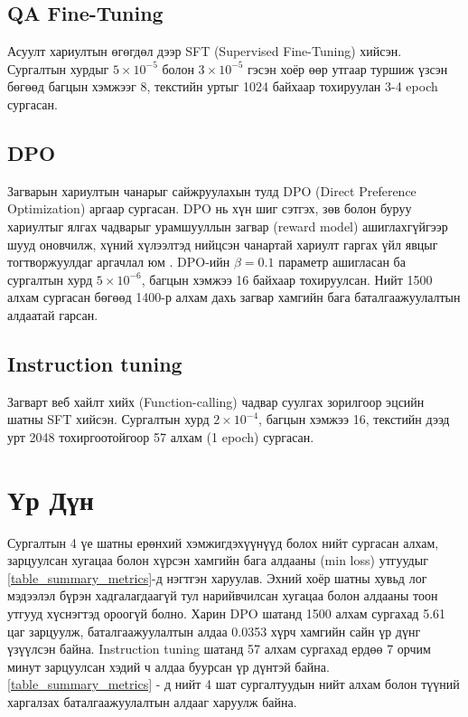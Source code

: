 \documentclass[a4paper,10pt,twocolumn]{article}
\begin{document}
	\subsection{QA Fine-Tuning}
	Асуулт хариултын өгөгдөл дээр SFT (Supervised Fine-Tuning) хийсэн. Сургалтын хурдыг $5 \times 10^{-5}$ болон $3 \times 10^{-5}$ гэсэн хоёр өөр утгаар туршиж үзсэн бөгөөд багцын хэмжээг 8, текстийн уртыг 1024 байхаар тохируулан 3-4 epoch сургасан.
	
	\subsection{DPO}
	Загварын хариултын чанарыг сайжруулахын тулд DPO (Direct Preference Optimization) аргаар \cite{dpo} сургасан. DPO нь хүн шиг сэтгэх, зөв болон буруу хариултыг ялгах чадварыг урамшууллын загвар (reward model) ашиглахгүйгээр шууд оновчилж, хүний хүлээлтэд нийцсэн чанартай хариулт гаргах үйл явцыг тогтворжуулдаг аргачлал юм \cite{dpo}. DPO-ийн $\beta=0.1$ параметр ашигласан ба сургалтын хурд $5 \times 10^{-6}$, багцын хэмжээ 16 байхаар тохируулсан. Нийт 1500 алхам сургасан бөгөөд 1400-р алхам дахь загвар хамгийн бага баталгаажуулалтын алдаатай гарсан.
	
	\subsection{Instruction tuning}
	Загварт веб хайлт хийх (Function-calling) чадвар суулгах зорилгоор эцсийн шатны SFT хийсэн. Сургалтын хурд $2 \times 10^{-4}$, багцын хэмжээ 16, текстийн дээд урт 2048 тохиргоотойгоор 57 алхам (1 epoch) сургасан. 
	
	\section{Үр Дүн}
	
	Сургалтын 4 үе шатны ерөнхий хэмжигдэхүүнүүд болох нийт сургасан алхам, зарцуулсан хугацаа болон хүрсэн хамгийн бага алдааны (min loss) утгуудыг \cref{table_summary_metrics}-д нэгтгэн харуулав. Эхний хоёр шатны хувьд лог мэдээлэл бүрэн хадгалагдаагүй тул нарийвчилсан хугацаа болон алдааны тоон утгууд хүснэгтэд ороогүй болно. Харин DPO шатанд 1500 алхам сургахад 5.61 цаг зарцуулж, баталгаажуулалтын алдаа 0.0353 хүрч хамгийн сайн үр дүнг үзүүлсэн байна. Instruction tuning шатанд 57 алхам сургахад ердөө 7 орчим минут зарцуулсан хэдий ч алдаа буурсан үр дүнтэй байна. \cref{table_summary_metrics} - д нийт 4 шат сургалтуудын нийт алхам болон түүний харгалзах баталгаажуулалтын алдааг харуулж байна.
	
\end{document}
